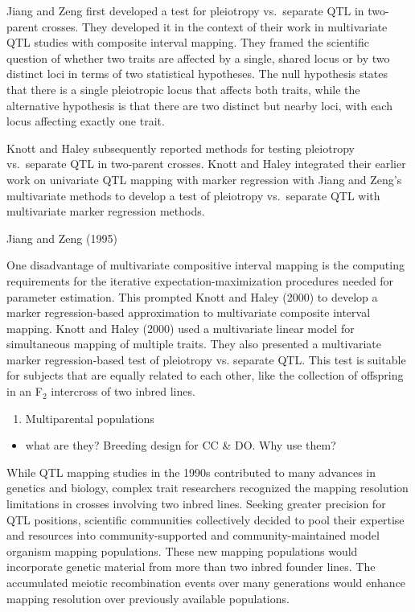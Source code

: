 \documentclass[]{article}
\providecommand{\tightlist}{%
  \setlength{\itemsep}{0pt}\setlength{\parskip}{0pt}}
\begin{document}
Jiang and Zeng first developed a test for pleiotropy vs.~separate QTL in
two-parent crosses. They developed it in the context of their work in
multivariate QTL studies with composite interval mapping. They framed
the scientific question of whether two traits are affected by a single,
shared locus or by two distinct loci in terms of two statistical
hypotheses. The null hypothesis states that there is a single
pleiotropic locus that affects both traits, while the alternative
hypothesis is that there are two distinct but nearby loci, with each
locus affecting exactly one trait.

Knott and Haley subsequently reported methods for testing pleiotropy
vs.~separate QTL in two-parent crosses. Knott and Haley integrated their
earlier work on univariate QTL mapping with marker regression with Jiang
and Zeng's multivariate methods to develop a test of pleiotropy
vs.~separate QTL with multivariate marker regression methods.

Jiang and Zeng (1995)

One disadvantage of multivariate compositive interval mapping is the
computing requirements for the iterative expectation-maximization
procedures needed for parameter estimation. This prompted Knott and
Haley (2000) to develop a marker regression-based approximation to
multivariate composite interval mapping. Knott and Haley (2000) used a
multivariate linear model for simultaneous mapping of multiple traits.
They also presented a multivariate marker regression-based test of
pleiotropy vs. separate QTL. This test is suitable for subjects that are
equally related to each other, like the collection of offspring in an
F\(_2\) intercross of two inbred lines.

\begin{enumerate}
\def\labelenumi{\arabic{enumi}.}
\setcounter{enumi}{3}
\tightlist
\item
  Multiparental populations
\end{enumerate}

\begin{itemize}
\tightlist
\item
  what are they? Breeding design for CC \& DO. Why use them?
\end{itemize}

While QTL mapping studies in the 1990s contributed to many advances in
genetics and biology, complex trait researchers recognized the mapping
resolution limitations in crosses involving two inbred lines. Seeking
greater precision for QTL positions, scientific communities collectively
decided to pool their expertise and resources into community-supported
and community-maintained model organism mapping populations. These new
mapping populations would incorporate genetic material from more than
two inbred founder lines. The accumulated meiotic recombination events
over many generations would enhance mapping resolution over previously
available populations.
\end{document}
